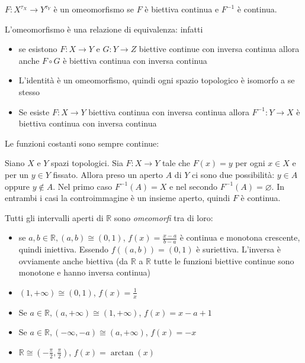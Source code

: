 \begin{definition}[Omeomorfismo]
    \(F: X^{\tau_X} \to Y^{\tau_Y}\) è un omeomorfismo se \(F\) è biettiva
    continua e \(F^{-1}\) è continua.
\end{definition}
\begin{remark}
    L'omeomorfismo è una relazione di equivalenza: infatti
\begin{itemize}[label = --]
    \item se esistono \(F: X \to Y\) e \(G: Y \to  Z\) biettive continue con
        inversa continua allora anche \(F \circ G\) è biettiva continua con
        inversa continua
    \item L'identità è un omeomorfismo, quindi ogni spazio topologico è isomorfo
        a se stesso
    \item Se esiste \(F: X \to  Y\) biettiva continua con inversa continua
        allora \(F^{-1}: Y \to  X\) è biettiva continua con inversa continua
\end{itemize}

\end{remark}

\begin{example}
    Le funzioni costanti sono sempre continue:

    Siano \(X\) e \(Y\) spazi
    topologici. Sia \(F : X \to  Y\) tale che \(F(x) = y\) per ogni \(x \in X\) e per
    un \(y \in Y\) fissato. Allora preso un aperto \(A\) di \(Y\) ci sono due
    possibilità: \(y \in A\) oppure \(y \not\in A\). Nel primo caso \(F^{-1}(A)
    = X\) e nel secondo \(F^{-1}(A) = \varnothing\). In entrambi i casi la
    controimmagine è un insieme aperto, quindi \(F\) è continua.
\end{example}

\begin{example}
    Tutti gli intervalli aperti di \(\mathbb{R}\) sono \emph{omeomorfi} tra di
    loro:
\begin{itemize}[label = --]
    \item se \(a, b \in \mathbb{R}, (a, b) \cong (0, 1)\), \(f(x) = \frac{x -
        a}{b - a}\) è continua e monotona crescente, quindi iniettiva. Essendo
        \(f((a, b)) = (0, 1)\) è suriettiva. L'inversa è ovviamente anche
        biettiva (da \(\mathbb{R}\) a \(\mathbb{R}\) tutte le funzioni biettive
        continue sono monotone e hanno inversa continua)
    \item \((1, +\infty) \cong (0, 1)\), \(f(x) = \frac{1}{x}\) 
    \item Se \(a \in \mathbb{R}, (a, +\infty) \cong  (1, +\infty)\), \(f(x) = x
        - a + 1\) 
    \item Se \(a \in \mathbb{R}, (-\infty, -a) \cong  (a, +\infty)\), \(f(x) =
        -x\) 
    \item \(\mathbb{R} \cong (-\frac{\pi}{2}, \frac{\pi}{2})\), \(f(x) =
        \arctan(x)\) 
\end{itemize}

\end{example}

